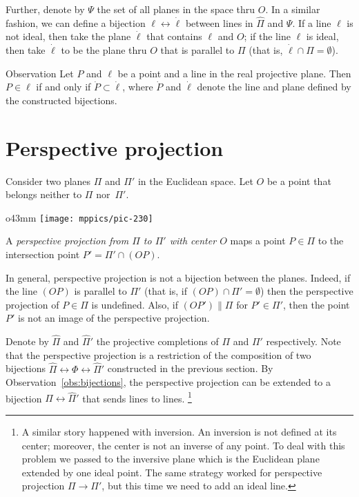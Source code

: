 Further, denote by $\Psi$ the set of all planes in the space thru $O$.
In a similar fashion, we can define a bijection $\ell\leftrightarrow \dot \ell$ between lines in $\hat \Pi$ and $\Psi$.
If a line $\ell$ is not ideal, then take the plane  $\dot \ell$ that contains $\ell$ and $O$;
if the line $\ell$ is ideal, then take $\dot \ell$ to be the plane thru $O$ that is parallel to $\Pi$ (that is, $\dot\ell\cap\Pi=\emptyset$).

\begin{thm}{Observation}\label{obs:bijections}
Let $P$ and $\ell$ be a point and a line in the real projective plane.
Then $P\in \ell$ if and only if $\dot P\subset \dot \ell$,
where $\dot P$ and $\dot \ell$ denote the line and plane defined by the constructed bijections.
\end{thm}

\section{Perspective projection}
\label{sec:perspective-projection}

Consider two planes $\Pi$ and $\Pi'$ 
in the Euclidean space. 
Let $O$ be a point that belongs neither to $\Pi$ nor~$\Pi'$.

\begin{wrapfigure}{o}{43mm}
\centering
\texttt{[image: mppics/pic-230]}
\end{wrapfigure}

A \emph{perspective projection from $\Pi$ to $\Pi'$ with center $O$} maps a point $P\in \Pi$
to the intersection point $P'=\Pi'\cap (OP)$.

In general, perspective projection is not a bijection between the planes.
Indeed, if the line $(OP)$ is parallel to $\Pi'$ 
(that is, if $(OP)\cap\Pi'=\emptyset$)
then the perspective projection of $P\in \Pi$ is undefined.
Also, if $(OP')\parallel \Pi$ 
for $P'\in \Pi'$,
then the point $P'$ is not an image of the perspective projection.

Denote by $\hat \Pi$ and $\hat \Pi'$ the projective completions of $\Pi$ and $\Pi'$ respectively. 
Note that the perspective projection is a restriction of the composition of two bijections $\hat \Pi\leftrightarrow\Phi \leftrightarrow\hat \Pi'$ constructed in the previous section.
By Observation~\ref{obs:bijections}, the perspective projection can be extended to a bijection $\hat \Pi\leftrightarrow\hat \Pi'$ that sends lines to lines.%
\footnote{A similar story happened with inversion.
An inversion is not defined at its center;
moreover, the center is not an inverse of any point.
To deal with this problem we passed to the inversive plane 
which is the Euclidean plane extended by one ideal point.
The same strategy worked for perspective projection $\Pi\to\Pi'$, but this time we need to add an ideal line.}

